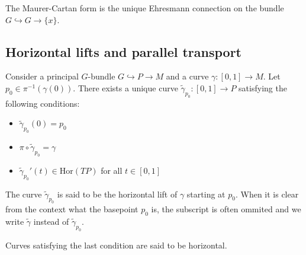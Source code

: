 	\begin{property}
		The Maurer-Cartan form is the unique Ehresmann connection on the bundle $G\hookrightarrow G\rightarrow \{x\}$.
	\end{property}
	
\subsection{Horizontal lifts and parallel transport}
	
	\begin{property}
		Consider a principal $G$-bundle $G\hookrightarrow P\rightarrow M$ and a curve $\gamma:[0, 1]\rightarrow M$. Let $p_0\in \pi^{-1}(\gamma(0))$. There exists a unique curve $\widetilde{\gamma}_{p_0}:[0, 1]\rightarrow P$ satisfying the following conditions:
		\begin{itemize}
			\item $\widetilde{\gamma}_{p_0}(0) = p_0$
			\item $\pi\circ\widetilde{\gamma}_{p_0} = \gamma$
			\item $\widetilde{\gamma}_{p_0}'(t)\in\text{Hor}(TP)$ for all $t\in[0, 1]$
		\end{itemize}
		The curve $\widetilde{\gamma}_{p_0}$ is said to be the horizontal lift of $\gamma$ starting at $p_0$. When it is clear from the context what the basepoint $p_0$ is, the subscript is often ommited and we write $\widetilde{\gamma}$ instead of $\widetilde{\gamma}_{p_0}$.
	\end{property}
	\begin{remark}
		Curves satisfying the last condition are said to be horizontal.
	\end{remark}
	
	
